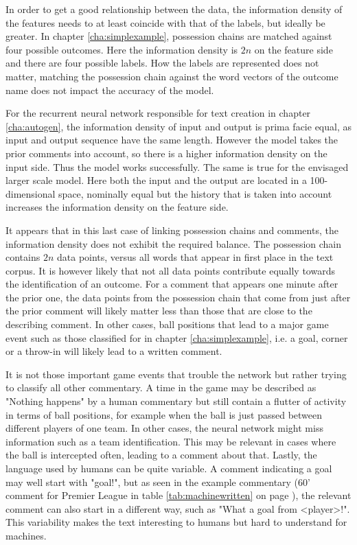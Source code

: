 \documentclass[10pt, a4paper]{UUThesisTemplate}
\begin{document}
In order to get a good relationship between the data, the information density of the features needs to at least coincide with that of the labels, but ideally be greater. In chapter \ref{cha:simplexample}, possession chains are matched against four possible outcomes. Here the information density is $2n$ on the feature side and there are four possible labels. How the labels are represented does not matter, matching the possession chain against the word vectors of the outcome name does not impact the accuracy of the model.

For the recurrent neural network responsible for text creation in chapter \ref{cha:autogen}, the information density of input and output is prima facie equal, as input and output sequence have the same length. However the model takes the prior comments into account, so there is a higher information density on the input side. Thus the model works successfully. The same is true for the envisaged larger scale model. Here both the input and the output are located in a 100-dimensional space, nominally equal but the history that is taken into account increases the information density on the feature side.

It appears that in this last case of linking possession chains and comments, the information density does not exhibit the required balance. The possession chain contains $2n$ data points, versus all words that appear in first place in the text corpus. It is however likely that not all data points contribute equally towards the identification of an outcome. For a comment that appears one minute after the prior one, the data points from the possession chain that come from just after the prior comment will likely matter less than those that are close to the describing comment. In other cases, ball positions that lead to a major game event such as those classified for in chapter \ref{cha:simplexample}, i.e. a goal, corner or a throw-in will likely lead to a written comment. 

It is not those important game events that trouble the network but rather trying to classify all other commentary. A time in the game may be described as "Nothing happens" by a human commentary but still contain a flutter of activity in terms of ball positions, for example when the ball is just passed between different players of one team. In other cases, the neural network might miss information such as a team identification. This may be relevant in cases where the ball is intercepted often, leading to a comment about that. Lastly, the language used by humans can be quite variable. A comment indicating a goal may well start with "goal!", but as seen in the example commentary (60' comment for Premier League in table \ref{tab:machinewritten} on page \pageref{tab:machinewritten}), the relevant comment can also start in a different way, such as "What a goal from <player>!". This variability makes the text interesting to humans but hard to understand for machines. \cleardoublepage
\end{document}
